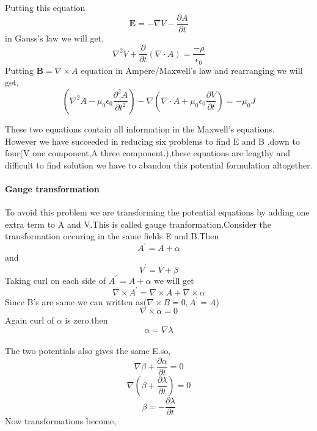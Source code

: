 Putting this equation $$\mathbf{E}=-\nabla V-\frac{\partial A}{\partial t}$$  in Gauss's law
we will get,\\
$$\nabla ^2V+\frac{\partial }{\partial t}(\nabla \cdot A)=\frac{-\rho}{\epsilon_{0}}$$
Putting $\mathbf{B}=\nabla\times A$  equation in Ampere/Maxwell's law and rearranging we will get,\\
$$\left( \nabla^2A-\mu_{0}\epsilon_{0}\frac{\partial^2 A}{\partial t^2}\right) -\nabla\left( \nabla \cdot A+\mu_{0}\epsilon_{0}\frac{\partial V}{\partial t}\right) =-\mu_{0} J$$ 

These two equations contain all information in the Maxwell's equations.\\
However we have succeeded in reducing six problems to find E and B ,down to four(V one component,A three component.),these equations are lengthy and difficult to find solution we have to abandon this potential formulation altogether.\\
\paragraph{Gauge transformation}
To avoid this problem we are transforming the potential equations by adding one extra term to A and V.This is called gauge tranformation.Consider the transformation occuring in the same fields E and B.Then\\
$$A^{\prime}=A+\alpha$$ and
$$V^{\prime}=V+\beta$$
Taking curl on each side of $A^{\prime}=A+\alpha$
we will get 
$$\nabla \times A^{\prime}=\nabla \times A+\nabla \times \alpha$$
Since B's are same we can written as($\nabla \times B=0,A^{\prime}=A$) \\
$$\nabla \times \alpha =0$$
Again curl of $\alpha$ is zero.then\\
$$\alpha=\nabla \lambda$$\\
The two potentials also gives the same E.so,\\
$$\nabla \beta +\frac{\partial \alpha }{\partial t}=0$$
$$\nabla\left( \beta+\frac{\partial \lambda}{\partial t}\right) =0$$
$$\beta= -\frac{\partial \lambda}{\partial t}$$
Now transformations become,\\

\begin{center}
\end{center}
